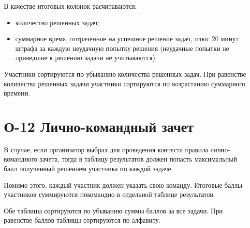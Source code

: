 \documentclass{book}
\newcommand{\newcard}[1]{\newpage \section*{#1}}
\begin{document}
	В качестве итоговых колонок расчитаваются:
	\begin{itemize}
		\item количество решенных задач;
		\item суммарное время, потраченное на успешное решение задач, плюс 20 минут штрафа за каждую неудачную попытку решения (неудачные попытки не приведшие к решению задачи не учитываются).
	\end{itemize} 
	
	Участники сортируются по убыванию количества решенных задач. При равенстве количества решенных задачи участники сортируются по возрастанию суммарного времени.

\newcard{О-12 Лично-командный зачет}
	В случае, если организатор выбрал для проведения контеста правила лично-командного зачета, тогда в таблицу результатов должен попасть максимальный балл полученный решением участника по каждой задаче.

	Помимо этого, каждый участник должен указать свою команду. Итоговые баллы участников суммируются покомандно в отдельной таблице результатов.

	Обе таблицы сортируются по убыванию суммы баллов за все задачи. При равенстве баллов таблицы сортируются по алфавиту.
	
\end{document}
